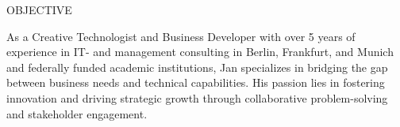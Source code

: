 \documentclass{resume} %
\begin{document}

\begin{rSection}{OBJECTIVE}

{As a Creative Technologist and Business Developer with over 5 years of experience in IT- and management consulting in Berlin, Frankfurt, and Munich and federally funded academic institutions, Jan specializes in bridging the gap between business needs and technical capabilities. His passion lies in fostering innovation and driving strategic growth through collaborative problem-solving and stakeholder engagement.}


\end{rSection}
\end{document}
